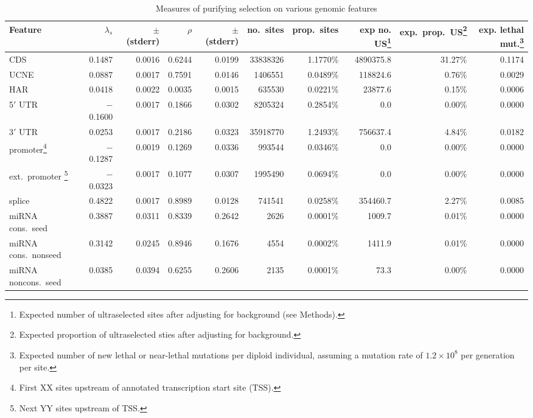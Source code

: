 \documentclass[11pt]{article}
\begin{document}
\begin{table}
  \caption{Measures of purifying selection on various genomic features}
  \vspace{2ex}
  \label{tab:features}
    \centering
  \begin{footnotesize}
  \begin{tabular}{lrrrrrrrrr}
  \hline
  Feature	& $\lambda_s$ & $\pm$ (stderr) & $\rho$ & $\pm$ (stderr) &no.\ sites & prop.\ sites&	exp no. US\footnote{Expected number of ultraselected sites after adjusting for background (see Methods).} & exp.\ prop.\ US\footnote{Expected proportion of ultraselected sties after adjusting for background.}&exp. lethal mut.\footnote{Expected number of new lethal or near-lethal mutations per diploid individual, assuming a mutation rate of $1.2\times 10^8$ per generation per site.}\\
  \hline
CDS & 0.1487 & 0.0016 & 0.6244 & 0.0199 & 33838326 & 1.1770\% & 4890375.8 & 31.27\% & 0.1174\\
UCNE & 0.0887 & 0.0017 & 0.7591 & 0.0146 & 1406551 & 0.0489\% & 118824.6 & 0.76\% & 0.0029\\
HAR & 0.0418 & 0.0022 & 0.0035 & 0.0015 & 635530 & 0.0221\% & 23877.6 & 0.15\% & 0.0006\\
5$'$ UTR & $-$0.1600 & 0.0017 & 0.1866 & 0.0302 & 8205324 & 0.2854\% & 0.0 & 0.00\% & 0.0000\\
3$'$ UTR & 0.0253 & 0.0017 & 0.2186 & 0.0323 & 35918770 & 1.2493\% & 756637.4 & 4.84\% & 0.0182\\
promoter\footnote{First XX sites upstream of annotated transcription start site (TSS).} & $-$0.1287 & 0.0019 & 0.1269 & 0.0336 & 993544 & 0.0346\% & 0.0 & 0.00\% & 0.0000\\
ext.\ promoter \footnote{Next YY sites upstream of TSS.}& $-$0.0323 & 0.0017 & 0.1077 & 0.0307 & 1995490 & 0.0694\% & 0.0 & 0.00\% & 0.0000\\
splice & 0.4822 & 0.0017 & 0.8989 & 0.0128 & 741541 & 0.0258\% & 354460.7 & 2.27\% & 0.0085\\
miRNA cons.\ seed & 0.3887 & 0.0311 & 0.8339 & 0.2642 & 2626 & 0.0001\% & 1009.7 & 0.01\% & 0.0000\\
miRNA cons.\ nonseed & 0.3142 & 0.0245 & 0.8946 & 0.1676 & 4554 & 0.0002\% & 1411.9 & 0.01\% & 0.0000\\
miRNA noncons.\ seed & 0.0385 & 0.0394 & 0.6255 & 0.2606 & 2135 & 0.0001\% & 73.3 & 0.00\% & 0.0000\\

\end{tabular}
\end{footnotesize}
\end{table}
\end{document}
